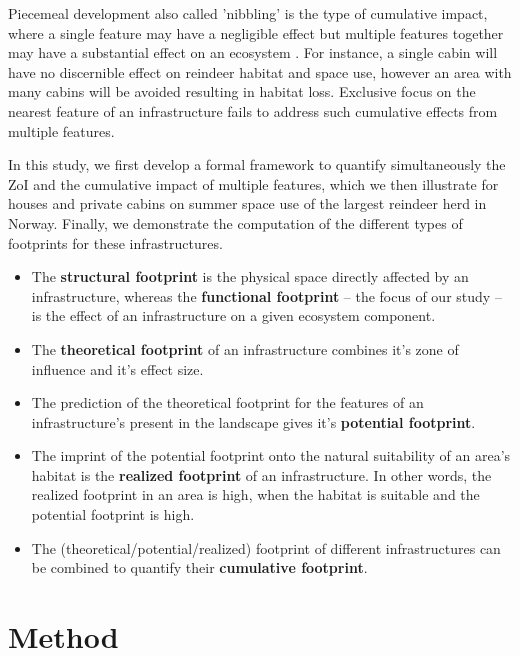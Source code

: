 \documentclass{article}
\begin{document}
Piecemeal development also called 'nibbling' is the type of cumulative impact, where a single feature may have a negligible effect but multiple features together may have a substantial effect on an ecosystem \citep{nellemann2003progressive}. For instance, a single cabin will have no discernible effect on reindeer habitat and space use, however an area with many cabins will be avoided resulting in habitat loss. Exclusive focus on the nearest feature of an infrastructure fails to address such cumulative effects from multiple features. 

In this study, we first develop a formal framework to quantify simultaneously the ZoI and the cumulative impact of multiple features, which we then illustrate for houses and private cabins on summer space use of the largest reindeer herd in Norway. Finally, we demonstrate the computation of the different types of footprints for these infrastructures.  

\begin{tcolorbox}[colback=yellow!5,colframe=yellow!75!black,title=BOX -- Types of Anthropogenic Footprint]
\begin{itemize}
    \item The \textbf{structural footprint} is the physical space directly affected by an infrastructure, whereas the \textbf{functional footprint} -- the focus of our study -- is the effect of an infrastructure on a given ecosystem component.  
    \item The \textbf{theoretical footprint} of an infrastructure combines it's zone of influence and it's effect size. 
    \item The prediction of the theoretical footprint for the features of an infrastructure's present in the landscape gives it's \textbf{potential footprint}.
    \item The imprint of the potential footprint onto the natural suitability of an area's habitat is the \textbf{realized footprint} of an infrastructure. In other words, the realized footprint in an area is high, when the habitat is suitable and the potential footprint is high.  
    \item The (theoretical/potential/realized) footprint of different infrastructures can be combined to quantify their \textbf{cumulative footprint}. 
\end{itemize}
\end{tcolorbox}


\section{Method}
\end{document}
